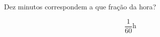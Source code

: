 
\question [\questaopt] Dez minutos correspondem a que fração da hora?



	\begin{solution}
		
	$$
	\frac{1}{60}\si{\hour}
	$$
		
	\end{solution}

